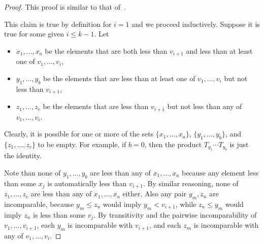 \documentclass[ALCO,ThmDefs,Unicode,epreuves]{cedram}
\begin{document}
\begin{proof}
This proof is similar to that of~\cite[Lemma 2.21]{antichain-toggling}.

This claim is true by definition for $i=1$ and we proceed inductively. Suppose it is true for some given $i\leq k-1$. Let
\begin{itemize}
\item $x_1,\dots,x_a$ be the elements that are both less than $v_{i+1}$ and less than at least one of $v_1,\dots,v_i$,
\item $y_1,\dots,y_b$ be the elements that are less than at least one of $v_1,\dots,v_i$ but not less than $v_{i+1}$,
\item $z_1,\dots,z_c$ be the elements that are less than $v_{i+1}$ but not less than any of $v_1,\dots,v_i$.
\end{itemize}
Clearly, it is possible for one or more of the sets $\{x_1,\dots,x_a\}$, $\{y_1,\dots,y_b\}$, and $\{z_1,\dots,z_c\}$ to be empty. For example, if $b=0$, then the product $T_{y_1}\cdots T_{y_b}$ is just the identity.

Note than none of $y_1,\dots,y_b$ are less than any of $x_1,\dots,x_a$ because any element less than some $x_j$ is automatically less than $v_{i+1}$. By similar reasoning, none of $z_1,\dots,z_c$ are less than any of $x_1,\dots,x_a$ either.
Also any pair $y_m,z_n$ are incomparable, because $y_m \leq z_n$ would imply $y_m<v_{i+1}$, while $z_n \leq y_m$ would imply $z_n$ is less than some $v_j$.
By transitivity and the pairwise incomparability of $v_1,\dots,v_{i+1}$, each $y_m$ is incomparable with $v_{i+1}$, and each $z_m$ is incomparable with any of $v_1,\dots,v_i$.


\end{proof}
\end{document}
